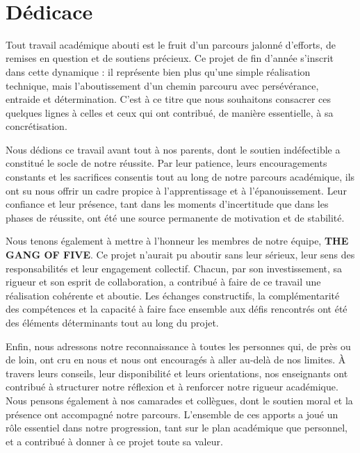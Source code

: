 \documentclass[12pt,a4paper]{report}
\newcommand{\headingfont}{}
\begin{document}
	\newpage
	\thispagestyle{empty}
	\ 
	\newpage
	
	\setcounter{page}{1}
	
	\newpage
	\chapter*{{\headingfont Dédicace}}
	
	Tout travail académique abouti est le fruit d'un parcours jalonné d'efforts, de remises en question et de soutiens précieux. Ce projet de fin d'année s'inscrit dans cette dynamique : il représente bien plus qu'une simple réalisation technique, mais l'aboutissement d'un chemin parcouru avec persévérance, entraide et détermination. C'est à ce titre que nous souhaitons consacrer ces quelques lignes à celles et ceux qui ont contribué, de manière essentielle, à sa concrétisation.
	
	Nous dédions ce travail avant tout à nos parents, dont le soutien indéfectible a constitué le socle de notre réussite. Par leur patience, leurs encouragements constants et les sacrifices consentis tout au long de notre parcours académique, ils ont su nous offrir un cadre propice à l'apprentissage et à l'épanouissement. Leur confiance et leur présence, tant dans les moments d'incertitude que dans les phases de réussite, ont été une source permanente de motivation et de stabilité.
	
	Nous tenons également à mettre à l'honneur les membres de notre équipe, \textbf{THE GANG OF FIVE}. Ce projet n'aurait pu aboutir sans leur sérieux, leur sens des responsabilités et leur engagement collectif. Chacun, par son investissement, sa rigueur et son esprit de collaboration, a contribué à faire de ce travail une réalisation cohérente et aboutie. Les échanges constructifs, la complémentarité des compétences et la capacité à faire face ensemble aux défis rencontrés ont été des éléments déterminants tout au long du projet.
	
	Enfin, nous adressons notre reconnaissance à toutes les personnes qui, de près ou de loin, ont cru en nous et nous ont encouragés à aller au-delà de nos limites. À travers leurs conseils, leur disponibilité et leurs orientations, nos enseignants ont contribué à structurer notre réflexion et à renforcer notre rigueur académique. Nous pensons également à nos camarades et collègues, dont le soutien moral et la présence ont accompagné notre parcours. L'ensemble de ces apports a joué un rôle essentiel dans notre progression, tant sur le plan académique que personnel, et a contribué à donner à ce projet toute sa valeur.
	
\end{document}
